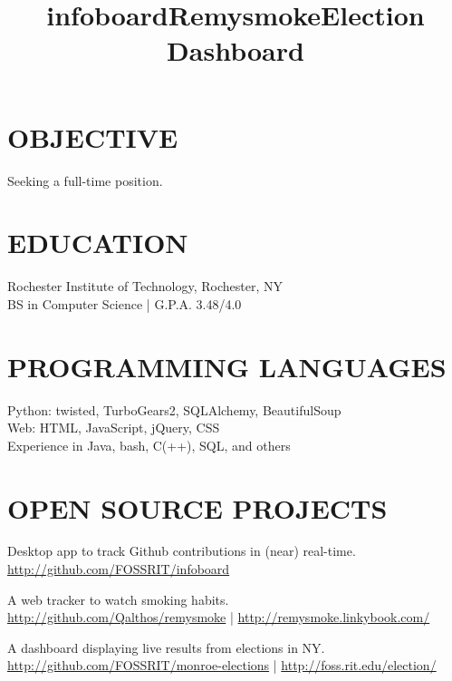 \documentclass[line]{res}
\begin{document}

\begin{resume}

\section{OBJECTIVE}
    Seeking a full-time position.

\section{EDUCATION}
    Rochester Institute of Technology, Rochester, NY \\
    BS in Computer Science | G.P.A. 3.48/4.0

\section{PROGRAMMING LANGUAGES}
    Python: twisted, TurboGears2, SQLAlchemy, BeautifulSoup\\
    Web: HTML, JavaScript, jQuery, CSS\\
    Experience in Java, bash, C(++), SQL, and others

\section{OPEN SOURCE PROJECTS}
    \title{infoboard}
    \employer{}
    \begin{position}
        Desktop app to track Github contributions in (near) real-time.\\
        \url{http://github.com/FOSSRIT/infoboard}
    \end{position}

    \title{Remysmoke}
    \begin{position}
        A web tracker to watch smoking habits.\\
        \url{http://github.com/Qalthos/remysmoke} | \url{http://remysmoke.linkybook.com/}
    \end{position}

    \title{Election Dashboard}
    \begin{position}
        A dashboard displaying live results from elections in NY.\\
        \url{http://github.com/FOSSRIT/monroe-elections} | \url{http://foss.rit.edu/election/}
    \end{position}


\end{resume}
\end{document}
